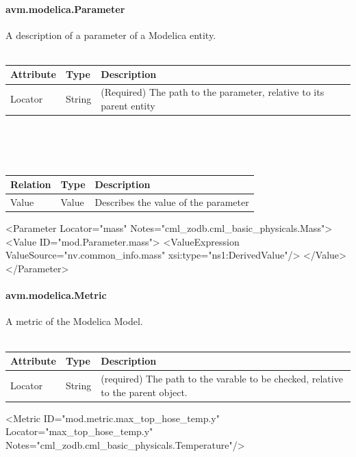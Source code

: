 \paragraph{avm.modelica.Parameter}
A description of a parameter of a Modelica entity.
\\ \\
\begin{tabular}{ l l p{9cm} }
\textbf{Attribute} & \textbf{Type} & \textbf{Description} \\ \hline
Locator & String & (Required) The path to the parameter, relative to its parent entity \\ \hline
\end{tabular}
\\ \\ \\
\begin{tabular}{ l l p{9cm} }
\textbf{Relation} & \textbf{Type} & \textbf{Description} \\ \hline
Value & Value & Describes the value of the parameter \\ \hline
\end{tabular}

\begin{MyVerbatim}
    <Parameter 
      Locator="mass" 
      Notes="cml_zodb.cml_basic_physicals.Mass">
      <Value ID="mod.Parameter.mass">
        <ValueExpression ValueSource="nv.common_info.mass"  
           xsi:type="ns1:DerivedValue"/>
      </Value>
    </Parameter>
\end{MyVerbatim}

\paragraph{avm.modelica.Metric}
A metric of the Modelica Model.
\\ \\
\begin{tabular}{ l l p{9cm} }
\textbf{Attribute} & \textbf{Type} & \textbf{Description} \\ \hline
Locator & String & (required) The path to the varable to be checked, relative to the parent object. \\ \hline
\end{tabular}

\begin{MyVerbatim}
    <Metric ID="mod.metric.max_top_hose_temp.y" 
      Locator="max_top_hose_temp.y" 
      Notes="cml_zodb.cml_basic_physicals.Temperature"/>
\end{MyVerbatim}


